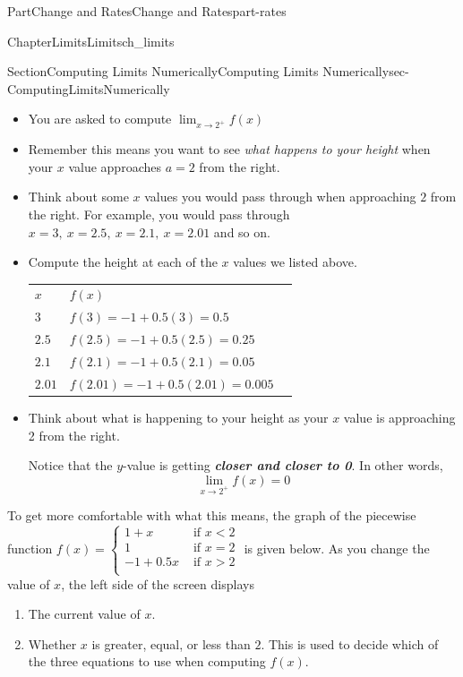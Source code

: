 \documentclass{tufte-book}
\newcommand{\tabularfont}{\relax}
\newcommand{\alert}[1]{\textbf{\textit{#1}}}
\numberwithin{equation}{chapter}
\newcommand{\hrulemedium}{\noalign{\hrule height 0.07em}}
\newcommand{\lt}{<}
\newcommand{\gt}{>}
\begin{document}
\begin{partptx}{Part}{Change and Rates}{}{Change and Rates}{}{}{part-rates}
\begin{chapterptx}{Chapter}{Limits}{}{Limits}{}{}{ch_limits}
\begin{sectionptx}{Section}{Computing Limits Numerically}{}{Computing Limits Numerically}{}{}{sec-ComputingLimitsNumerically}
%
\begin{itemize}[label=\textbullet]
\item{}You are asked to compute \(\displaystyle \lim_{x\rightarrow 2^+} f(x)\)%
\item{}Remember this means you want to see \emph{what happens to your height} when your \(x\) value approaches \(a=2\) from the right.%
\item{}Think about some \(x\) values you would pass through when approaching \(2\) from the right.  For example, you would pass through \(x=3,\ x=2.5,\ x=2.1,\ x=2.01\) and so on.%
\item{}Compute the height at each of the \(x\) values we listed above. \begin{center}%
{\tabularfont%
\begin{tabular}{lBl}
\(x\)&\(f(x)\)\tabularnewline\hrulemedium
\(3\)&\(f(3) = -1 + 0.5(3) = 0.5 \)\tabularnewline\hrulemedium
\(2.5\)&\(f(2.5) = -1 + 0.5(2.5) = 0.25 \)\tabularnewline\hrulemedium
\(2.1\)&\(f(2.1) = -1 + 0.5(2.1) = 0.05 \)\tabularnewline\hrulemedium
\(2.01\)&\(f(2.01) = -1 + 0.5(2.01) = 0.005 \)
\end{tabular}
}%
\end{center}%
%
\item{}Think about what is happening to your height as your \(x\) value is approaching 2 from the right.%
\par
Notice that the \(y\)-value is getting \alert{closer and closer to 0}.  In other words,%
\begin{equation*}
\lim_{x\rightarrow 2^+} f(x) = 0
\end{equation*}
%
\end{itemize}
%
\par
To get more comfortable with what this means, the graph of the piecewise function \(f(x) = 
\begin{cases}
1 + x   & \text{ if } x \lt 2 \\   
1       & \text{ if } x = 2 \\   
-1+0.5x & \text{ if } x \gt 2 \\   
\end{cases}\) is given below. As you change the value of \(x\), the left side of the screen displays%
\begin{enumerate}
\item{}The current value of \(x\).%
\item{}Whether \(x\) is greater, equal, or less than \(2\). This is used to decide which of the three equations to use when computing \(f(x)\).%

\end{enumerate}
\end{sectionptx}
\end{chapterptx}
\end{partptx}
\end{document}
